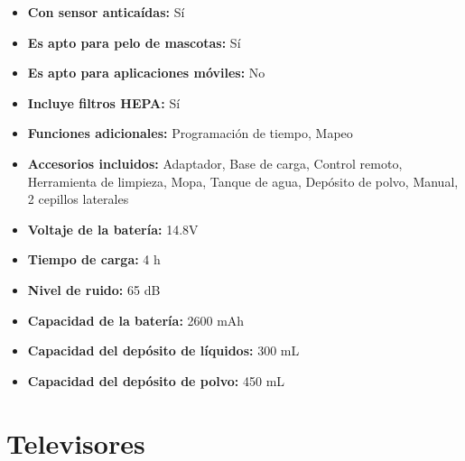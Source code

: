 \documentclass{article}
\begin{document}
\begin{adjustwidth}{2em}{}
\begin{itemize}
\begin{itemize}
    \item \textbf {Con sensor anticaídas:} Sí
    \item \textbf {Es apto para pelo de mascotas:} Sí
    \item \textbf {Es apto para aplicaciones móviles:} No
    \item \textbf {Incluye filtros HEPA:} Sí
    \item \textbf {Funciones adicionales:} Programación de tiempo, Mapeo
    \item \textbf {Accesorios incluidos:} Adaptador, Base de carga, Control remoto, Herramienta de limpieza, Mopa, Tanque de agua, Depósito de polvo, Manual, 2 cepillos laterales
    \item \textbf {Voltaje de la batería:} 14.8V
    \item \textbf {Tiempo de carga:} 4 h
    \item \textbf {Nivel de ruido:} 65 dB
    \item \textbf {Capacidad de la batería:} 2600 mAh
    \item \textbf {Capacidad del depósito de líquidos:} 300 mL
    \item \textbf {Capacidad del depósito de polvo:} 450 mL
        \end{itemize}
    \end{itemize}

    \vspace{1\baselineskip} %
    \end{adjustwidth}

    
    \section*{Televisores}
    \setcounter{subsection}{0} %
    
\end{document}
